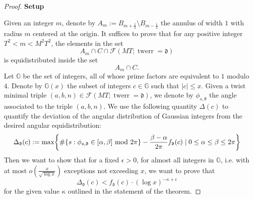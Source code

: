 \documentclass[12pt]{amsart}
\numberwithin{equation}{section} %
\theoremstyle{definition} \newtheorem{definition}[counter]{Definition}
\theoremstyle{remark} \newtheorem{nonexam}[counter]{Non-example}
\newcommand{\FF}{\mathscr{F}} %
\let\originalleft\left \let\originalright\right
\renewcommand{\left}{\mathopen{}\mathclose\bgroup\originalleft}
\renewcommand{\right}{\aftergroup\egroup\originalright}
\DeclareMathOperator{\twerr}{twerr} %
\begin{document}
\begin{proof}

\medskip 
\textbf{Setup}
\medskip

    Given an integer $m$, denote by $A_m := B_{m + \frac{1}{2}} \setminus B_{m - \frac{1}{2}}$ the annulus of width $1$ with radius $m$ centered at the origin.
    It suffices to prove that for any positive integer $T^2 < m < M^2 T^2$, the elements in the set 
    \begin{equation*}
        A_m \cap C \cap \FF(MT; \twerr = \mathfrak{d})
    \end{equation*}
    is equidistributed inside the set 
    \begin{equation*}
        A_m \cap C.
    \end{equation*}
    Let $\mathbb{G}$ be the set of integers, all of whose prime factors are equivalent to $1$ modulo $4$. Denote by $\mathbb{G}(x)$ the subset of integers $c \in \mathbb{G}$ such that $|c| \leq x$. Given a twist minimal triple $(a,b,n) \in \FF(MT; \twerr = \mathfrak{d})$, we denote by $\phi_{s,\mathfrak{d}}$ the angle associated to the triple $(a,b,n)$. We use the following quantity $\Delta(c)$ to quantify the deviation of the angular distribution of Gaussian integers from the desired angular equidistribution: 
    \begin{equation}
        \Delta_\mathfrak{d}(c) := \text{max} \left\{ \# \{s : \phi_{s,\mathfrak{d}} \in [\alpha, \beta] \text{ mod } 2\pi\} - \frac{\beta - \alpha}{2\pi} f_{\mathfrak{d}}(c) \; | \; 0 \leq \alpha \leq \beta \leq 2 \pi \right\}
    \end{equation}
    Then we want to show that for a fixed $\epsilon > 0$, for almost all integers in $\mathbb{G}$, i.e. with at most $o(\frac{x}{\sqrt{\log x}})$ exceptions not exceeding $x$, we want to prove that
    \begin{equation} \label{eq:equid_0}
        \Delta_\mathfrak{d}(c) < f_{\mathfrak{d}}(c) \cdot (\log x)^{-\kappa + \epsilon}
    \end{equation}
    for the given value $\kappa$ outlined in the statement of the theorem. 
    

\end{proof}
\end{document}
